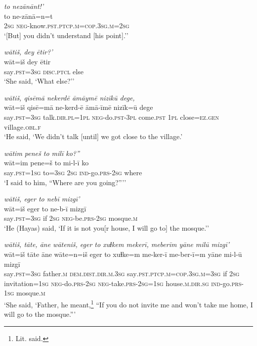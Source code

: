 \ea \label{ŽH.28}
\textit{to nezānānt!’} \\ 
\gll to ne-zānā=n=t \\ 
 \textsc{2sg} \textsc{neg-}know\textsc{.pst}\textsc{.ptcp}\textsc{.m}\textsc{=cop}\textsc{.3sg}\textsc{.m}\textsc{=\textsc{2sg}} \\ 
\glt `[But] you didn’t understand [his point].’'
\z 
 
\ea \label{ŽH.29}
\textit{wātiš, dey ētir?’} \\ 
\gll wāt=iš dey ētir \\ 
 say\textsc{.pst}\textsc{=3sg} \textsc{disc.ptcl} else \\ 
\glt `She said, ‘What else?’'
\z 
 
\ea \label{ŽH.30}
\textit{wātiš, qisēmā nekerdē āmāymē nizīkū dege,} \\ 
\gll wāt=iš qisē=mā ne-kerd-ē āmā-īmē nizīk=ū dege \\ 
 say\textsc{.pst}\textsc{=3sg} talk\textsc{.dir}\textsc{.pl}\textsc{=1pl} \textsc{neg-}do\textsc{.pst}\textsc{-3pl} come\textsc{.pst} \textsc{1pl} close\textsc{=ez}\textsc{.gen} village\textsc{.obl}\textsc{\textsc{.f}} \\ 
\glt `He said, ‘We didn’t talk [until] we got close to the village.'
\z 
 
\ea \label{ŽH.31}
\textit{wātim peneš to milī ko?”} \\ 
\gll wāt=im pene=š to mi-l-ī ko \\ 
 say\textsc{.pst}\textsc{=1sg} to\textsc{=3sg} \textsc{2sg} \textsc{ind-}go\textsc{.prs}-\textsc{2sg} where \\ 
\glt `I said to him, “Where are you going?”’'
\z 
 
\ea \label{ŽH.32}
\textit{wātiš, eger to nebī mizgī’} \\ 
\gll wāt=iš eger to ne-b-ī mizgī \\ 
 say\textsc{.pst}\textsc{=3sg} if \textsc{2sg} \textsc{neg-}be\textsc{.prs}-\textsc{2sg} mosque\textsc{.m} \\ 
\glt `He (Hayas) said, ‘If it is not you[r house, I will go to] the mosque.’'
\z 
 
\ea \label{ŽH.33}
\textit{wātiš, tāte, āne wāteniš, eger to xuɫkem mekerī, meberīm yāne milū mizgī’} \\ 
\gll wāt=iš tāte āne wāte=n=iš eger to xuɫke=m me-ker-ī me-ber-ī=m yāne mi-l-ū mizgī \\ 
 say\textsc{.pst}\textsc{=3sg} father\textsc{.m} \textsc{dem.dist}\textsc{.dir}\textsc{.m}\textsc{.3sg} say\textsc{.pst}\textsc{.ptcp}\textsc{.m}\textsc{=cop}\textsc{.3sg}\textsc{.m}\textsc{=3sg} if \textsc{2sg} invitation\textsc{=1sg} \textsc{neg-}do\textsc{.prs}-\textsc{2sg} \textsc{neg-}take\textsc{.prs}-\textsc{2sg}\textsc{=1sg} house\textsc{.m}\textsc{.dir.sg} \textsc{ind-}go\textsc{.prs}\textsc{-1sg} mosque\textsc{.m} \\ 
\glt `She said, ‘Father, he meant,\footnote{Lit. said.} “If you do not invite me and won’t take me home, I will go to the mosque.”'
\z 
 
